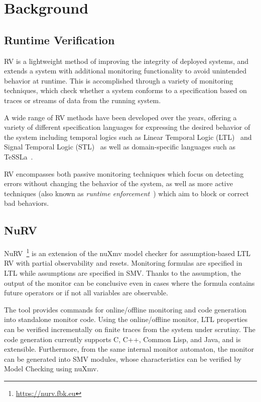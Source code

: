 \section{Background}\label{sec:background}

\subsection{Runtime Verification}
RV is a lightweight method of improving the integrity of deployed systems, and extends a system with additional monitoring functionality to avoid unintended behavior at runtime.
This is accomplished through a variety of monitoring techniques, which check whether a system conforms to a specification based on traces or streams of data from the running system.

A wide range of RV methods have been developed over the years, offering a variety of different specification languages for expressing the desired behavior of the system including temporal logics such as Linear Temporal Logic (LTL)~\cite{pnueli1977ltl} and Signal Temporal Logic (STL)~\cite{donze2013stl} as well as domain-specific languages such as TeSSLa~\cite{convent2018tessla}.

RV encompasses both passive monitoring techniques which focus on detecting errors without changing the behavior of the system, as well as more active techniques (also known as \emph{runtime enforcement}~\cite{falcone2010runtimeenforcement}) which aim to block or correct bad behaviors.

\subsection{NuRV}

NuRV~\cite{CimattiTT19a}\footnote{\url{https://nurv.fbk.eu}} is an extension of the nuXmv model checker for assumption-based LTL RV with partial observability and resets. Monitoring formulas are specified in LTL while assumptions are specified in SMV. Thanks to the assumption, the output of the monitor can be conclusive even in cases where the formula contains future operators or if not all variables are observable.

The tool provides commands for online/offline monitoring and code generation into standalone monitor code. Using the online/offline monitor, LTL properties can be verified incrementally on finite traces from the system under scrutiny. The code generation currently supports C, C++, Common Lisp, and Java, and is extensible. Furthermore, from the same internal monitor automaton, the monitor can be generated into SMV modules, whose characteristics can be verified by Model Checking using nuXmv.


